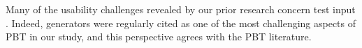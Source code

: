 



Many of the usability challenges revealed by our prior research concern test input
.
Indeed, generators were regularly cited as one of the most challenging
aspects of PBT in our study, and this perspective agrees with the PBT literature.

